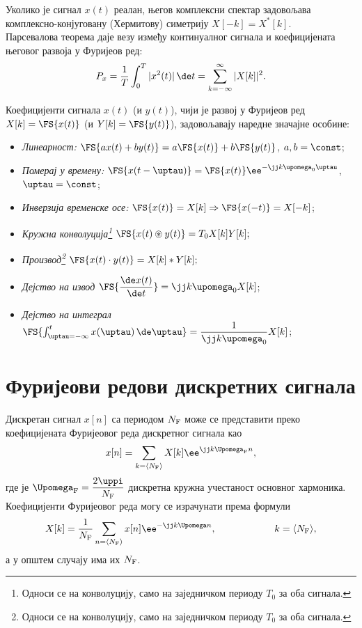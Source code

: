 Уколико је сигнал $x(t)$ реалан, његов комплексни спектар задовољава комплексно-конјуговану (Хермитову) симетрију 
$X[-k] = X^{\ast}[k]$. \\[1mm]

\noindent 
Парсевалова теорема даје везу између  континуалног сигнала и коефицијената
његовог развоја у Фуријеов ред:
\begin{equation}
P_x = \dfrac{1}{T} \int_{0}^{T} |x^2(t)|\,\de t = \sum_{k=-\infty}^{\infty} |X[k]|^2. \label{eq:ctfs_parseval}
\end{equation}

Коефицијенти сигнала $x(t)$ (и $y(t)$), чији је развој у Фуријеов ред
$X[k] = \FS{x(t)}$ (и $Y[k] = \FS{y(t)}$),
задовољавају наредне значајне особине: 
\begin{itemize}\itemsep0pt
    \item \emph{Линеарност:}  $\FS{ax(t) + by(t)} = a \FS{x(t)} + b \FS{y(t)}$, $a,b = \const$;
    \item \emph{Померај у времену:} $ \FS{x(t-\uptau)} = \FS{x(t)} \ee^{-\jj k \upomega_{\rm 0} \uptau}$, $\uptau = \const$;
    \item \emph{Инверзија временске осе:} $\FS{x(t)} = X[k] \Rightarrow \FS{x(-t)} = X[-k] $;
    \item \emph{Кружна конволуција\footnote{Односи се на конволуцију, само на заједничком периоду $T_0$ за оба сигнала.}}
    $
    \FS{x(t) \circledast y(t)} = T_0 X[k] Y[k];
    $
    \item \emph{Производ\footnote{Односи се на конволуцију, само на заједничком периоду $T_0$ за оба сигнала.}}
    $
    \FS{x(t) \cdot y(t)} = X[k] \ast Y[k];
    $
    \item \emph{Дејство на извод} $\FS{ \dfrac{\de x(t)}{\de t} } = \jj k \upomega_0 X[k]$;
    \item \emph{Дејство на интеграл} $\FS{ \int_{\uptau = -\infty}^t x(\uptau) \, \de \uptau } = \dfrac{1}{\jj k \upomega_0} X[k]$;
\end{itemize}

\section*{Фуријеови редови дискретних сигнала}

Дискретан сигнал $x[n]$ са периодом $N_{\rm F}$ може се представити преко коефицијената Фуријеовог 
реда дискретног сигнала као
\begin{eqnarray}
    x[n] = \sum_{k = \langle N_{\rm F} \rangle } X[k] \ee^{ \jj k \Upomega_{\rm F} n }, 
\end{eqnarray}
где је $\Upomega_{\rm F} = \dfrac{2\uppi}{N_{\rm F}}$ дискретна кружна учестаност основног хармоника. Коефицијенти 
Фуријеовог реда могу се израчунати према формули 
\begin{equation}
    X[k] = \dfrac{1}{N_{\rm F}} \sum_{n = \langle N_{\rm F} \rangle} x[n] \ee^{-\jj k \Upomega n}, 
    \qquad\qquad\qquad
    k = \langle N_{\rm F} \rangle,
\end{equation}
а у општем случају има их $N_{\rm F}$. 

